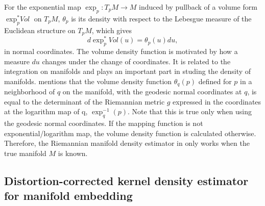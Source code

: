 \documentclass[11pt,a4paper,]{article}
\begin{document}
For the exponential map \(\exp_p: T_pM \rightarrow M\) induced by pullback of a volume form \(\exp_p^*\textit{Vol}\) on \(T_pM\), \(\theta_p\) is its density with respect to the Lebesgue measure of the Euclidean structure on \(T_pM\), which gives
\[
d\exp_p^*\textit{Vo}l(u) = \theta_p(u)du,
\]
in normal coordinates. The volume density function is motivated by how a measure \(du\) changes under the change of coordinates. It is related to the integration on manifolds and plays an important part in studing the density of manifolds.
\textcite{Pelletier2005-vu} mentions that the volume density function \(\theta_q(p)\) defined for \(p\) in a neighborhood of \(q\) on the manifold, with the geodesic normal coordinates at \(q\), is equal to the determinant of the Riemannian metric \(g\) expressed in the coordinates at the logarithm map of q, \(\exp_q^{-1}(p)\).
Note that this is true only when using the geodesic normal coordinates. If the mapping function is not exponential/logarithm map, the volume density function is calculated otherwise. Therefore, the Riemannian manifold density estimator in \textcite{Pelletier2005-vu} only works when the true manifold \(M\) is known.

\hypertarget{dckde}{%
\subsection{Distortion-corrected kernel density estimator for manifold embedding}\label{dckde}}
\end{document}
